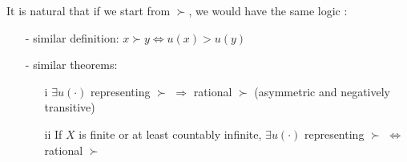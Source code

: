 It is natural that if we start from $\succ$, we would have the same logic \citep[See][Page 30]{kreps1990acourse}:

\begin{enumerate}
    \item[-] similar definition: $x\succ y\Leftrightarrow u(x)>u(y)$
    \item[-] similar theorems: 
    \begin{enumerate}
        \item[i] $\exists u(\cdot)$ representing $\succ$ $\Rightarrow$ rational $\succ$ (asymmetric and negatively transitive)
        \item[ii] If $X$ is finite or at least countably infinite, $\exists u(\cdot)$ representing $\succ$ $\Leftrightarrow$ rational $\succ$
    \end{enumerate} 
\end{enumerate}